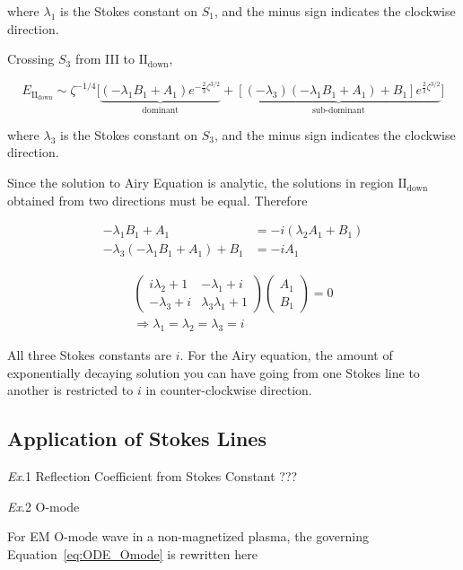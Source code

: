 \documentclass[
  notoc %
]{tufte-book}
\begin{document}
where \(\lambda_1\) is the Stokes constant on \(S_1\), and the minus
sign indicates the clockwise direction.

Crossing \(S_3\) from III to \(\text{II}_{\text{down}}\),

\[
E_{\text{II}_{\text{down}}} \sim \zeta^{-1/4} \Big[ \underbrace{(-\lambda_1B_1+A_1) e^{-\frac{2}{3}\zeta^{3/2}}}_{\text{dominant}} + \underbrace{ [(-\lambda_3)(-\lambda_1 B_1+A_1)+B_1]e^{\frac{2}{3}\zeta^{3/2}}}_{\text{sub-dominant}} \Big]
\]

where \(\lambda_3\) is the Stokes constant on \(S_3\), and the minus
sign indicates the clockwise direction.

Since the solution to Airy Equation is analytic, the solutions in region
\(\text{II}_{\text{down}}\) obtained from two directions must be equal.
Therefore

\[
\begin{aligned}
-\lambda_1 B_1 + A_1 &= -i(\lambda_2 A_1 + B_1) \\
-\lambda_3 (-\lambda_1 B_1 + A_1) + B_1 &= -i A_1
\end{aligned}
\]

\[
\begin{aligned}
\begin{pmatrix}
i\lambda_2 + 1 & -\lambda_1 + i \\ -\lambda_3 + i & \lambda_3\lambda_1 + 1
\end{pmatrix}
\begin{pmatrix}
A_1 \\ B_1
\end{pmatrix} = 0 \\
\Rightarrow \lambda_1 = \lambda_2 = \lambda_3 = i
\end{aligned}
\]

All three Stokes constants are \(i\). For the Airy equation, the amount
of exponentially decaying solution you can have going from one Stokes
line to another is restricted to \(i\) in counter-clockwise direction.

\hypertarget{sec:stokes_application}{%
\subsection{Application of Stokes Lines}\label{sec:stokes_application}}

\emph{Ex}.1 Reflection Coefficient from Stokes Constant ???

\emph{Ex}.2 O-mode

For EM O-mode wave in a non-magnetized plasma, the governing
Equation~\ref{eq:ODE_Omode} is rewritten here
\end{document}
